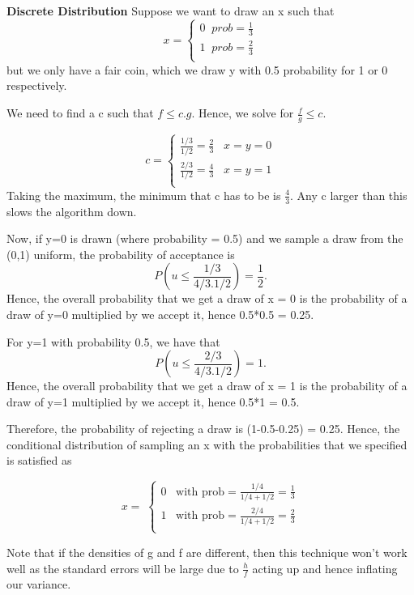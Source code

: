 \documentclass[twoside]{article}
\begin{document}
\bigskip

\textbf{Discrete Distribution}
Suppose we want to draw an x such that
\[x = \begin{cases}
    
    0 \;\; prob=\frac{1}{3}\\
    1 \;\; prob=\frac{2}{3}\\
    \end{cases}
\]
but we only have a fair coin, which we draw y with 0.5 probability for 1 or 0 respectively. 

We need to find a c such that $f \leq c.g$. Hence, we solve for $\frac{f}{g} \leq c$. 

\[c = \begin{cases}
    
    \frac{1/3}{1/2} = \frac{2}{3} \;\;\; x=y=0\\
    \frac{2/3}{1/2} = \frac{4}{3} \;\;\; x=y=1\\
    \end{cases}
\]
Taking the maximum, the minimum that c has to be is $\frac{4}{3}$. Any c larger than this slows the algorithm down. 

Now, if y=0 is drawn (where probability = 0.5) and we sample a draw from the (0,1) uniform, the probability of acceptance is
$$
P(u \leq \frac{1/3}{4/3 . 1/2}) = \frac{1}{2}.
$$
Hence, the overall probability that we get a draw of x = 0 is the probability of a draw of y=0 multiplied by we accept it, hence 0.5*0.5 = 0.25. 

For y=1 with probability 0.5, we have that 
$$
P(u \leq \frac{2/3}{4/3 . 1/2}) = 1.
$$
Hence, the overall probability that we get a draw of x = 1 is the probability of a draw of y=1 multiplied by we accept it, hence 0.5*1 = 0.5. 

Therefore, the probability of rejecting a draw is (1-0.5-0.25) = 0.25. Hence, the conditional distribution of sampling an x with the probabilities that we specified is satisfied as

\[x = \; \begin{cases}
    
    0\;\;\; \text{with prob} = \frac{1/4}{1/4 + 1/2} = \frac{1}{3}\\
    1\;\;\; \text{with prob} = \frac{2/4}{1/4 + 1/2} = \frac{2}{3}\\
    \end{cases}
\]


Note that if the densities of g and f are different, then this technique won't work well as the standard errors will be large due to $\frac{h}{f}$ acting up and hence inflating our variance.
\end{document}
